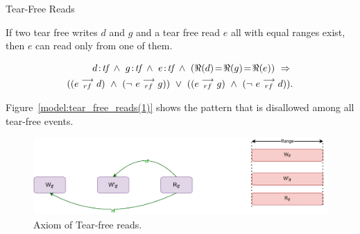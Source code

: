 
        \begin{axiom}{Tear-Free Reads} 
            \label{TfRe}

            If two tear free writes $d$ and $g$ and a tear free read $e$ all with equal ranges exist, then $e$ can read only from one of them\footnotemark.
                
            \begin{align*}
                \et{d}{tf}\ \wedge\ \et{g}{tf} \ \wedge \ \et{e}{tf} 
                  \ \wedge \ 
                  (\Re(d) \!=\! \Re(g) \!=\! \Re(e)) 
                  \ \Rightarrow{} \\ 
                      ((\reln{e}{rf}{d}) 
                      \ \wedge \ 
                      (\neg \ \reln{e}{rf}{g})) 
                  \ \vee \  
                      ((\reln{e}{rf}{g}) 
                      \ \wedge \
                      (\neg \ \reln{e}{rf}{d})).
            \end{align*}
                    
            Figure~\ref{model:tear_free_reads(1)} shows the pattern that is disallowed among all tear-free events. 
            \begin{figure}[H]
                \centering
                \includegraphics[scale=0.7]{3.ECMAScriptMemoryModel/TearFreeReads.pdf}
                \caption{Axiom of Tear-free reads.}
                \label{model:tear_free_reads}
            \end{figure}

        \end{axiom}

